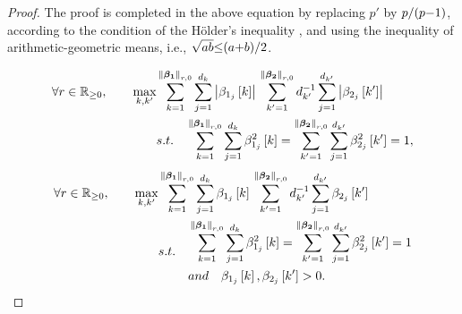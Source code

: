 \begin{proof}
The proof is completed in the above equation by replacing $p'$ by $p/(p {-} 1)$, according to the condition of the H{\"o}lder's inequality \cite{Golub2013}, and using the inequality of arithmetic-geometric means, i.e., $\sqrt{ab} {\leq} (a {+} b)/2$.

\begin{equation*}
\label{eq:main-opt-qp11} 
\begin{aligned}
\forall r \in \mathbb{R}_{\geq 0}, \qquad
\max_{k,k'}
&\displaystyle\sum_{k=1}^{\left\lVert\boldsymbol{\beta_1}\right\rVert_{r,0}} \displaystyle\sum_{j=1}^{d_k} \left\lvert\beta_{1_j}\left[ k \right]\right\rvert  \,
\displaystyle\sum_{k'=1}^{\left\lVert\boldsymbol{\beta_2}\right\rVert_{r,0}} d_{k'}^{-1} \displaystyle\sum_{j=1}^{d_{k'}} \left\lvert\beta_{2_j} \left[ k' \right] \right\rvert  \\
&s.t. \quad
\displaystyle\sum_{k=1}^{\left\lVert\boldsymbol{\beta_1}\right\rVert_{r,0}} \displaystyle\sum_{j=1}^{d_k} \beta_{1_j}^2 \left[ k \right] = 
\displaystyle\sum_{k'=1}^{\left\lVert\boldsymbol{\beta_2}\right\rVert_{r,0}} \displaystyle\sum_{j=1}^{d_{k'}} \beta_{2_j}^2 \left[ k' \right] = 1,
\end{aligned}
\end{equation*}
\begin{equation*}
\label{eq:main-opt-qp11} 
\begin{aligned}
\forall r \in \mathbb{R}_{\geq 0}, \qquad
\max_{k,k'}
&\displaystyle\sum_{k=1}^{\left\lVert\boldsymbol{\beta_1}\right\rVert_{r,0}} \displaystyle\sum_{j=1}^{d_k} \beta_{1_j}\left[ k \right]  \,
\displaystyle\sum_{k'=1}^{\left\lVert\boldsymbol{\beta_2}\right\rVert_{r,0}} d_{k'}^{-1} \displaystyle\sum_{j=1}^{d_{k'}} \beta_{2_j} \left[ k' \right]  \\
&s.t. \quad
\begin{aligned}
& \displaystyle\sum_{k=1}^{\left\lVert\boldsymbol{\beta_1}\right\rVert_{r,0}} \displaystyle\sum_{j=1}^{d_k} \beta_{1_j}^2 \left[ k \right] = 
\displaystyle\sum_{k'=1}^{\left\lVert\boldsymbol{\beta_2}\right\rVert_{r,0}} \displaystyle\sum_{j=1}^{d_{k'}} \beta_{2_j}^2 \left[ k' \right] = 1 \\
&and \quad \beta_{1_j} \left[ k \right],\beta_{2_j}\left[ k' \right] > 0.
\end{aligned}
\end{aligned}
\end{equation*}
\end{proof}
